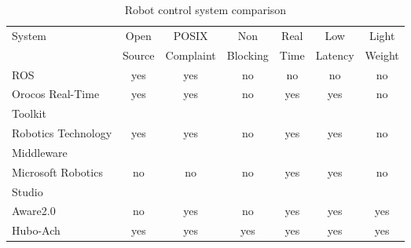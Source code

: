 \begin{table}
\caption{Robot control system comparison}
\begin{tabular}{l || c | c | c | c | c | c}
\hline
System                          & Open        & POSIX           & Non          & Real      & Low         & Light \\
                                &      Source &       Complaint &     Blocking &      Time &     Latency & Weight\\
\hline
\hline
ROS                             & yes         & yes             & no           & no        & no          & no \\
\hline
Orocos Real-Time                & yes         & yes             & no           & yes       & yes         & no \\
                 Toolkit        &             &                 &              &           &             &    \\
\hline

Robotics Technology             & yes         & yes             & no           & yes       & yes         & no \\
                    Middleware  &             &                 &              &           &             &    \\
\hline
Microsoft Robotics              & no          & no              & no           & yes       & yes         & no \\
                   Studio       &             &                 &              &           &             &    \\
\hline
Aware2.0                        & no          & yes             & no           & yes       & yes         & yes \\
\hline
Hubo-Ach                        & yes         & yes             & yes          & yes       & yes         & yes \\



\hline
\end{tabular}
\label{table:robotOS}
\end{table}
